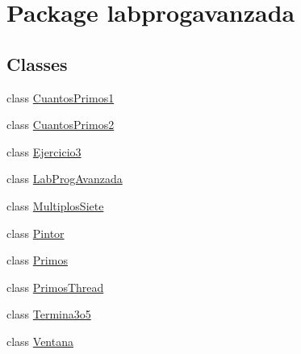 \hypertarget{namespacelabprogavanzada}{}\section{Package labprogavanzada}
\label{namespacelabprogavanzada}
\subsection*{Classes}
\begin{DoxyCompactItemize}
\item 
class \mbox{\hyperlink{classlabprogavanzada_1_1_cuantos_primos1}{Cuantos\+Primos1}}
\item 
class \mbox{\hyperlink{classlabprogavanzada_1_1_cuantos_primos2}{Cuantos\+Primos2}}
\item 
class \mbox{\hyperlink{classlabprogavanzada_1_1_ejercicio3}{Ejercicio3}}
\item 
class \mbox{\hyperlink{classlabprogavanzada_1_1_lab_prog_avanzada}{Lab\+Prog\+Avanzada}}
\item 
class \mbox{\hyperlink{classlabprogavanzada_1_1_multiplos_siete}{Multiplos\+Siete}}
\item 
class \mbox{\hyperlink{classlabprogavanzada_1_1_pintor}{Pintor}}
\item 
class \mbox{\hyperlink{classlabprogavanzada_1_1_primos}{Primos}}
\item 
class \mbox{\hyperlink{classlabprogavanzada_1_1_primos_thread}{Primos\+Thread}}
\item 
class \mbox{\hyperlink{classlabprogavanzada_1_1_termina3o5}{Termina3o5}}
\item 
class \mbox{\hyperlink{classlabprogavanzada_1_1_ventana}{Ventana}}
\end{DoxyCompactItemize}
